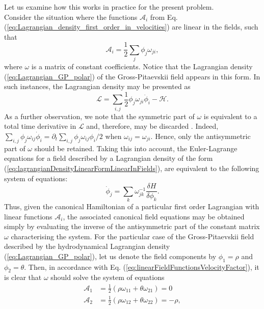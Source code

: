 \documentclass[twocolumn, nofootinbib, nobibnotes, amsmath,amssymb,aps, pra, floatfix]{revtex4-1}
\begin{document}
Let us examine how this works in practice for the present problem.\\
Consider the situation where the functions $\mathcal{A}_i$ from Eq. (\ref{eq:Lagrangian_density_first_order_in_velocities}) are linear in the fields, such that
\begin{equation}
  \mathcal{A}_i=\frac{1}{2}\sum_j\phi_j\omega_{ji},
  \label{eq:linearFieldFunctionsVelocityFactor}
\end{equation}
where $\omega$ is a matrix of constant coefficients.
Notice that the Lagrangian density (\ref{eq:Lagrangian_GP_polar}) of the Gross-Pitaevskii field appears in this form.
In such instances, the Lagrangian density may be presented as
\begin{equation}
  \mathcal{L}=\sum_{i,j}\frac{1}{2}\phi_j\omega_{ji}\dot{\phi}_i-\mathcal{H}.
  \label{eq:lagrangianDensityLinearFormLinearInFields}
\end{equation}
As a further observation, we note that the symmetric part of $\omega$ is equivalent to a total time derivative in $\mathcal{L}$ and, therefore, may be discarded \cite{jackiw1994quantization}.
Indeed, $\sum_{i,j}\phi_j\omega_{ij}\dot{\phi}_i=\partial_t\sum_{i,j}\phi_j\omega_{ij}\phi_i/2$ when $\omega_{ij}=\omega_{ji}$.
Hence, only the antisymmetric part of $\omega$ should be retained.
Taking this into account, the Euler-Lagrange equations for a field described by a Lagrangian density of the form (\ref{eq:lagrangianDensityLinearFormLinearInFields}), are equivalent to the following system of equations:
\begin{equation}
  \dot{\phi}_j=\sum_k \omega_{jk}^{-1}\frac{\delta H}{\delta\phi_k}.
  \label{eq:canonicalSystemEquationsLinearFormLinearFields}
\end{equation}
Thus, given the canonical Hamiltonian of a particular first order Lagrangian with linear functions $\mathcal{A}_i$, the associated canonical field equations may be obtained simply by evaluating the inverse of the antisymmetric part of the constant matrix $\omega$ characterising the system.
For the particular case of the Gross-Pitaevskii field described by the hydrodynamical Lagrangian density (\ref{eq:Lagrangian_GP_polar}), let us denote the field components by $\phi_1=\rho$ and $\phi_2=\theta$.
Then, in accordance with Eq. (\ref{eq:linearFieldFunctionsVelocityFactor}), it is clear that $\omega$ should solve the system of equations
\begin{align}
  \mathcal{A}_1&=\frac{1}{2}\left( \rho\omega_{11}+\theta\omega_{21} \right)=0 \\
  \mathcal{A}_2&=\frac{1}{2}\left( \rho\omega_{12}+\theta\omega_{22} \right)=-\rho,
  \label{}
\end{align}
\end{document}
